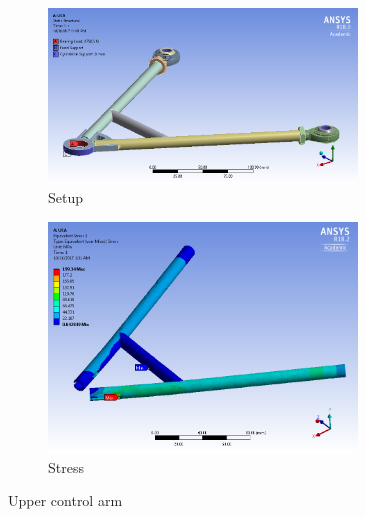 \documentclass[10pt]{article}
\begin{document}
\begin{figure}[H]
\centering
\begin{subfigure}[b]{.48\textwidth}
\centering
\includegraphics[width=0.9\textwidth]{figures/fea/parts/MS00017-UpperControlArm-Setup}
\caption{Setup}
\end{subfigure}
\begin{subfigure}[b]{.48\textwidth}
\centering
\includegraphics[width=0.9\textwidth]{figures/fea/parts/MS00017-UpperControlArm-Stress}
\caption{Stress}
\end{subfigure}
\caption{Upper control arm}
\label{fig:MS00017-UpperControlArm}
\end{figure}
\end{document}
